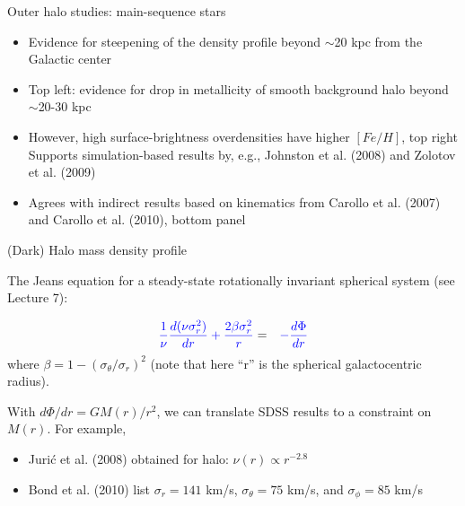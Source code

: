 \documentclass[letterpaper,landscape]{slides}
\begin{document}
\begin{slide}
{\begin{minipage}[t]{14cm}
\begin{center}
\vskip -1in
{\large \color{red} Outer halo studies: main-sequence stars}
\end{center}

\begin{itemize}
\item Evidence for steepening of the density profile beyond 
    $\sim$20 kpc from the Galactic center
\item {\color{blue} Top left: evidence for drop in metallicity of smooth background
       halo beyond $\sim$20-30 kpc}
\item {\color{red} However, high surface-brightness overdensities have 
     higher $[Fe/H]$, top right} Supports simulation-based results by, e.g., 
     Johnston et al. (2008) and Zolotov et al. (2009)
\item Agrees with indirect results based on kinematics from Carollo 
     et al. (2007) and Carollo et al. (2010), bottom panel
\end{itemize}     

\end{minipage}}
\vfill 
\end{slide}











\begin{slide}
\begin{center}
{\large \color{red} 
                     (Dark) Halo mass density profile  }
\end{center}

The Jeans equation for a steady-state rotationally invariant spherical system (see Lecture 7):

\begin{eqnarray}
\color{blue} {1 \over \nu}  {d(\nu \sigma_r^2) \over dr } + {2 \beta \sigma_r^2 \over r}  & = &
 \color{blue} -{d \Phi \over dr}  \nonumber
\end{eqnarray}
where $\beta = 1-(\sigma_\theta/\sigma_r)^2$ (note that here ``r'' is the spherical galactocentric radius). 

With $d\Phi/dr=GM(r)/r^2$, we can translate SDSS results to a constraint on $M(r)$. For example,
\begin{itemize}
\item Juri\'{c} et al. (2008) obtained for halo: $\nu(r) \propto r^{-2.8}$
\item Bond et al. (2010) list $\sigma_r=141$ km/s,  $\sigma_\theta=75$ km/s,  and $\sigma_\phi=85$ km/s
\end{itemize}

\vfill
\end{slide}
\end{document}
